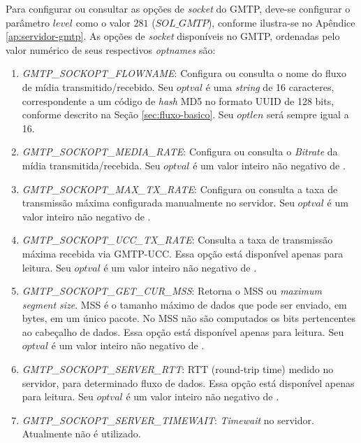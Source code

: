 \begin{apendicesenv}
Para configurar ou consultar as opções de \textit{socket} do GMTP, deve-se configurar o parâmetro $level$ como o valor $281$ ($SOL\_GMTP$), conforme ilustra-se no Apêndice \ref{ap:servidor-gmtp}.
As opções de \textit{socket} disponíveis no GMTP, ordenadas pelo valor numérico de seus respectivos \textit{optnames} são:

\begin{enumerate}
	\item \textit{GMTP\_SOCKOPT\_FLOWNAME}: Configura ou consulta o nome do fluxo de mídia transmitido/recebido. Seu $optval$ é uma \textit{string} de 16 caracteres, correspondente a um código de \textit{hash} MD5 no formato UUID de 128 bits, conforme descrito na Seção \ref{sec:fluxo-basico}. Seu $optlen$ será sempre igual a 16.
	
	\item \textit{GMTP\_SOCKOPT\_MEDIA\_RATE}: Configura ou consulta o \textit{Bitrate} da mídia transmitida/recebida. Seu $optval$ é um valor inteiro não negativo de .
	
	\item \textit{GMTP\_SOCKOPT\_MAX\_TX\_RATE}: Configura ou consulta a taxa de transmissão máxima configurada manualmente no servidor. Seu $optval$ é um valor inteiro não negativo de .
	
	\item \textit{GMTP\_SOCKOPT\_UCC\_TX\_RATE}: Consulta a taxa de transmissão máxima recebida via GMTP-UCC. Essa opção está disponível apenas para leitura. Seu $optval$ é um valor inteiro não negativo de .
	
	\item \textit{GMTP\_SOCKOPT\_GET\_CUR\_MSS}: Retorna o MSS ou \textit{maximum segment size}. MSS é o tamanho máximo de dados que pode ser enviado, em bytes, em um único pacote. No MSS não são computados os bits pertencentes ao cabeçalho de dados. 
	Essa opção está disponível apenas para leitura. Seu $optval$ é um valor inteiro não negativo de .
	
	\item \textit{GMTP\_SOCKOPT\_SERVER\_RTT}: RTT (round-trip time) medido no servidor, para determinado fluxo de dados. Essa opção está disponível apenas para leitura. Seu $optval$ é um valor inteiro não negativo de .
	
	\item \textit{GMTP\_SOCKOPT\_SERVER\_TIMEWAIT}: \textit{Timewait} no servidor. Atualmente não é utilizado. 
	

\end{enumerate}
\end{apendicesenv}
